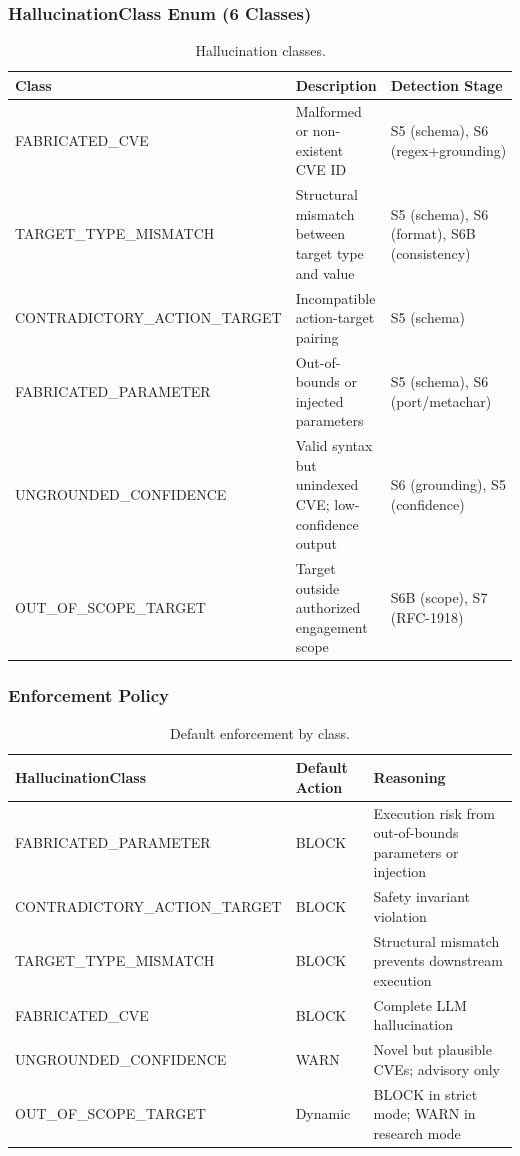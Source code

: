 ﻿\documentclass[10pt,journal,onecolumn]{IEEEtran}
\begin{document}
\subsubsection{HallucinationClass Enum (6 Classes)}
\begin{table}[t]
\caption{Hallucination classes.}
\label{tab:hallucination}
\begin{tabularx}{\textwidth}{>{\ttfamily}l X X}
\toprule
\textbf{Class} & \textbf{Description} & \textbf{Detection Stage}\\
\midrule
FABRICATED\_CVE & Malformed or non-existent CVE ID & S5 (schema), S6 (regex+grounding)\\
TARGET\_TYPE\_MISMATCH & Structural mismatch between target type and value & S5 (schema), S6 (format), S6B (consistency)\\
CONTRADICTORY\_ACTION\_TARGET & Incompatible action-target pairing & S5 (schema)\\
FABRICATED\_PARAMETER & Out-of-bounds or injected parameters & S5 (schema), S6 (port/metachar)\\
UNGROUNDED\_CONFIDENCE & Valid syntax but unindexed CVE; low-confidence output & S6 (grounding), S5 (confidence)\\
OUT\_OF\_SCOPE\_TARGET & Target outside authorized engagement scope & S6B (scope), S7 (RFC-1918)\\
\bottomrule
\end{tabularx}
\end{table}

\subsubsection{Enforcement Policy}
\begin{table}[h]
\caption{Default enforcement by class.}
\label{tab:enforcement}
\begin{tabularx}{\columnwidth}{>{\ttfamily}l l X}
\toprule
\textbf{HallucinationClass} & \textbf{Default Action} & \textbf{Reasoning}\\
\midrule
FABRICATED\_PARAMETER & BLOCK & Execution risk from out-of-bounds parameters or injection\\
CONTRADICTORY\_ACTION\_TARGET & BLOCK & Safety invariant violation\\
TARGET\_TYPE\_MISMATCH & BLOCK & Structural mismatch prevents downstream execution\\
FABRICATED\_CVE & BLOCK & Complete LLM hallucination\\
UNGROUNDED\_CONFIDENCE & WARN & Novel but plausible CVEs; advisory only\\
OUT\_OF\_SCOPE\_TARGET & Dynamic & BLOCK in strict mode; WARN in research mode\\
\bottomrule
\end{tabularx}
\end{table}
\end{document}
